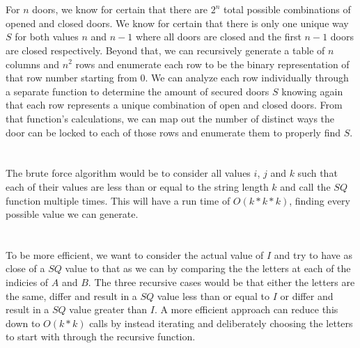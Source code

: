 \documentclass[12pt]{article}
\begin{document}
\maketitle

\section{}
For \(n\) doors, we know for certain that there are \(2^n\) total possible combinations of opened and closed doors. We know for certain that there is only one unique way \(S\) for both values \(n\) and \(n-1\) where all doors are closed and the first \(n-1\) doors are closed respectively. Beyond that, we can recursively generate a table of \(n\) columns and \(n^2\) rows and enumerate each row to be the binary representation of that row number starting from \(0\). We can analyze each row individually through a separate function to determine the amount of secured doors \(S\) knowing again that each row represents a unique combination of open and closed doors. From that function's calculations, we can map out the number of distinct ways the door can be locked to each of those rows and enumerate them to properly find \(S\).

\section{}
The brute force algorithm would be to consider all values \(i\), \(j\) and \(k\) such that each of their values are less than or equal to the string length \(k\) and call the \(SQ\) function multiple times. This will have a run time of \(O(k*k*k)\), finding every possible value we can generate.

\section{}
To be more efficient, we want to consider the actual value of \(I\) and try to have as close of a \(SQ\) value to that as we can by comparing the the letters at each of the indicies of \(A\) and \(B\). The three recursive cases would be that either the letters are the same, differ and result in a \(SQ\) value less than or equal to \(I\) or differ and result in a \(SQ\) value greater than \(I\). A more efficient approach can reduce this down to \(O(k*k)\) calls by instead iterating and deliberately choosing the letters to start with through the recursive function.
\end{document}
